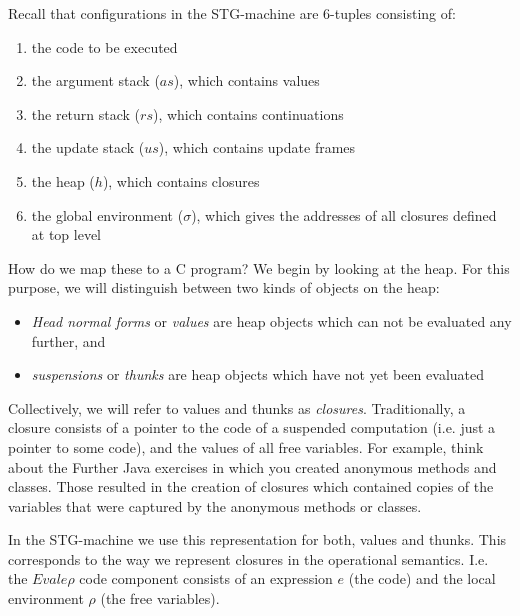 \documentclass{supervision}
\begin{document}
\begin{questions}
\begin{parts}
      \end{parts}

    \question Recall that configurations in the STG-machine are 6-tuples
      consisting of:

      \begin{enumerate}
        \item the code to be executed
        \item the argument stack ($as$), which contains values
        \item the return stack ($rs$), which contains continuations
        \item the update stack ($us$), which contains update frames
        \item the heap ($h$), which contains closures
        \item the global environment ($\sigma$), which gives the addresses of
          all closures defined at top level
      \end{enumerate}

      How do we map these to a C program? We begin by looking at the heap. For
      this purpose, we will distinguish between two kinds of objects on the
      heap:

      \begin{itemize}
        \item \emph{Head normal forms} or \emph{values} are heap objects which
          can not be evaluated any further, and
        \item \emph{suspensions} or \emph{thunks} are heap objects which have
          not yet been evaluated
      \end{itemize}

      Collectively, we will refer to values and thunks as \emph{closures}.
      Traditionally, a closure consists of a pointer to the code of a suspended
      computation (i.e. just a pointer to some code), and the values of all
      free variables. For example, think about the Further Java exercises in
      which you created anonymous methods and classes. Those resulted in the
      creation of closures which contained copies of the variables that were
      captured by the anonymous methods or classes.

      In the STG-machine we use this representation for both, values and
      thunks. This corresponds to the way we represent closures in the
      operational semantics. I.e. the $Eval e \rho$ code component consists of
      an expression $e$ (the code) and the local environment $\rho$ (the free
      variables).


\end{questions}
\end{document}
